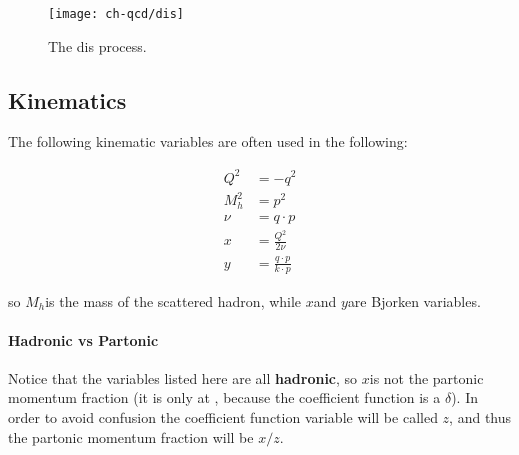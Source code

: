 \begin{figure}
	\centering
	\texttt{[image: ch-qcd/dis]}
	\caption{The \acrfull{dis} process.}
	\label{fig:qcd/dis}
\end{figure}

\subsection{Kinematics}

The following kinematic variables are often used in the following:

\begin{align}
	Q^2   & = - q^2                       \\
	M_h^2 & = p^2                         \\
	\nu   & = q \cdot p                   \\
	x     & = \frac{Q^2}{2\nu}            \\
	y     & = \frac{q \cdot p}{k \cdot p}
\end{align}

so $M_h$is the mass of the scattered hadron, while $x$and
$y$are Bjorken variables.

\paragraph{Hadronic vs Partonic} Notice that the variables listed here
are all \textbf{hadronic}, so $x$is not the partonic momentum fraction (it is only
at \lo , because the coefficient function is a $\delta$).
In order to avoid confusion the coefficient function variable will be called
$z$, and thus the partonic momentum fraction will be $x/z$.

